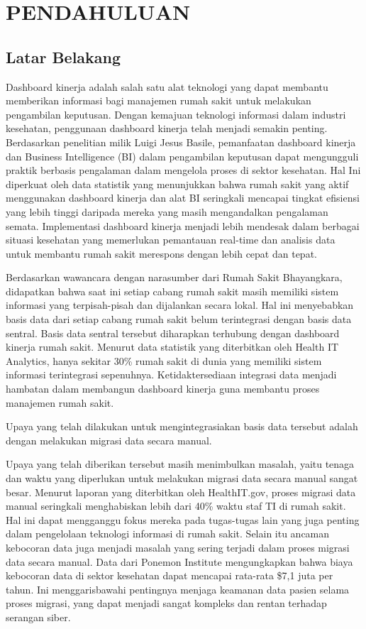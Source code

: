 \chapter{PENDAHULUAN}

\section{Latar Belakang}

Dashboard kinerja adalah salah satu alat teknologi yang dapat membantu memberikan informasi bagi manajemen rumah sakit untuk
melakukan pengambilan keputusan. Dengan kemajuan teknologi informasi dalam industri kesehatan, penggunaan dashboard kinerja telah menjadi semakin penting.
Berdasarkan penelitian milik Luigi Jesus Basile, pemanfaatan dashboard kinerja dan Business Intelligence (BI) dalam pengambilan keputusan dapat mengungguli praktik berbasis pengalaman 
dalam mengelola proses di sektor kesehatan\parencite{Basile2023}. Hal Ini diperkuat oleh data statistik yang menunjukkan bahwa rumah sakit yang aktif 
menggunakan dashboard kinerja dan alat BI seringkali mencapai tingkat efisiensi yang lebih tinggi daripada mereka yang masih 
mengandalkan pengalaman semata. Implementasi dashboard kinerja menjadi lebih mendesak dalam berbagai situasi kesehatan yang memerlukan pemantauan 
real-time dan analisis data untuk membantu rumah sakit merespons dengan lebih cepat dan tepat.

Berdasarkan wawancara dengan narasumber dari Rumah Sakit Bhayangkara, didapatkan bahwa saat ini setiap cabang rumah sakit masih memiliki 
sistem informasi yang terpisah-pisah dan dijalankan secara lokal. Hal ini menyebabkan basis data dari setiap cabang rumah sakit belum terintegrasi dengan basis data sentral. 
Basis data sentral tersebut diharapkan terhubung dengan dashboard kinerja rumah sakit. Menurut data statistik yang diterbitkan oleh
Health IT Analytics, hanya sekitar 30\% rumah sakit di dunia yang memiliki sistem informasi terintegrasi sepenuhnya. 
Ketidaktersediaan integrasi data menjadi hambatan dalam membangun dashboard kinerja guna membantu proses manajemen rumah sakit.

Upaya yang telah dilakukan untuk mengintegrasiakan basis data tersebut adalah dengan melakukan migrasi data secara manual. 

Upaya yang telah diberikan tersebut masih menimbulkan masalah, yaitu  tenaga dan waktu yang diperlukan untuk melakukan migrasi data secara manual sangat besar.
Menurut laporan yang diterbitkan oleh HealthIT.gov, proses migrasi data manual seringkali menghabiskan lebih dari 40\% waktu staf TI 
di rumah sakit. Hal ini dapat mengganggu fokus mereka pada tugas-tugas lain yang juga penting dalam pengelolaan teknologi 
informasi di rumah sakit. Selain itu ancaman kebocoran data juga menjadi masalah yang sering terjadi dalam proses migrasi data secara manual.
Data dari Ponemon Institute mengungkapkan bahwa biaya kebocoran data di sektor kesehatan dapat mencapai rata-rata 
\$7,1 juta per tahun. Ini menggarisbawahi pentingnya menjaga keamanan data pasien selama proses migrasi, 
yang dapat menjadi sangat kompleks dan rentan terhadap serangan siber.

